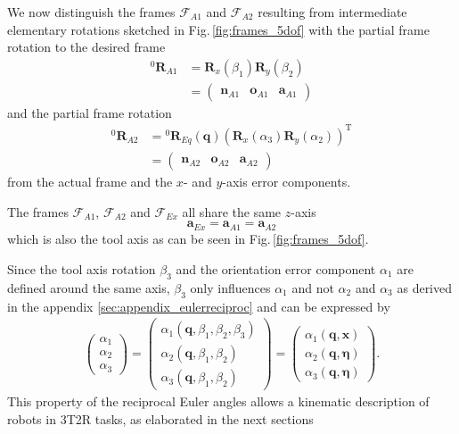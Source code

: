 \documentclass[twocolumn,10pt]{IFTOMM}
\newcommand{\bm}[1]{\boldsymbol{#1}}
\newcommand{\vek}[3]{\boldsymbol{#1}^{#2}_{#3}}
\newcommand{\rotmat}[2]{{{ }^{#1}\boldsymbol{R}}_{#2}}
\newcommand{\transp}[0]{{\mathrm{T}}}
\newcommand{\ks}[1]{{\mathcal{F}}_{#1}}
\begin{document}
We now distinguish the frames $\ks{A1}$ and $\ks{A2}$ resulting from intermediate elementary rotations sketched in Fig.\,\ref{fig:frames_5dof} with the partial frame rotation to the desired frame
%
\begin{align}
\rotmat{0}{A1} 
&= 
\bm{R}_x(\beta_1) \bm{R}_y(\beta_2)\\
&=
\begin{pmatrix}
\vek{n}{}{A1} & \vek{o}{}{A1} & \vek{a}{}{A1}
\end{pmatrix} \nonumber
\end{align}
%
and the partial frame rotation
%
\begin{align}
\rotmat{0}{A2} 
&= 
\rotmat{0}{Eq}(\bm{q})
\left(\bm{R}_x(\alpha_3) \bm{R}_y(\alpha_2)\right)^\transp \\ 
&=
\begin{pmatrix}
\vek{n}{}{A2} & \vek{o}{}{A2} & \vek{a}{}{A2}
\end{pmatrix}\nonumber
\end{align}
%
from the actual frame and the $x$- and $y$-axis error components.

The frames $\ks{A1}$, $\ks{A2}$ and $\ks{Ex}$ all share the same $z$-axis
%
\begin{equation}
\vek{a}{}{Ex}
=
\vek{a}{}{A1}
=
\vek{a}{}{A2}
\end{equation}
%
which is also the tool axis as can be seen in Fig.\,\ref{fig:frames_5dof}.

Since the tool axis rotation $\beta_3$ and the orientation error component $\alpha_1$ are defined around the same axis, $\beta_3$ only influences $\alpha_1$ and not $\alpha_2$ and $\alpha_3$ as derived in the appendix \ref{sec:appendix_eulerreciproc} and can be expressed by
%
\begin{align}
\begin{pmatrix}
\alpha_1 \\
\alpha_2 \\
\alpha_3
\end{pmatrix}
=
\begin{pmatrix}
\alpha_1(\bm{q},\beta_1,\beta_2,\beta_3) \\
\alpha_2(\bm{q},\beta_1,\beta_2) \\
\alpha_3(\bm{q},\beta_1,\beta_2)
\end{pmatrix}
=
\begin{pmatrix}
\alpha_1(\bm{q},\bm{x}) \\
\alpha_2(\bm{q},\bm{\eta}) \\
\alpha_3(\bm{q},\bm{\eta}) 
\end{pmatrix}
\label{equ:alpha_dep_beta}.
\end{align}
%
This property of the reciprocal Euler angles allows a kinematic description of robots in 3T2R tasks, as elaborated in the next sections
\end{document}
